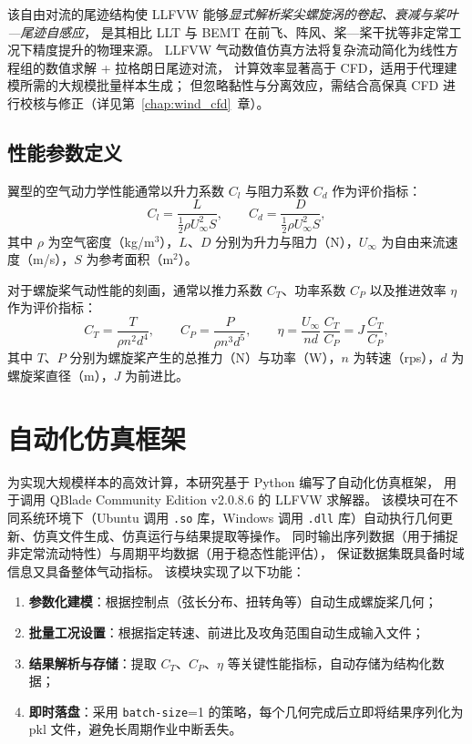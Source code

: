 该自由对流的尾迹结构使 LLFVW 能够\emph{显式解析桨尖螺旋涡的卷起、衰减与桨叶—尾迹自感应}，
是其相比 LLT 与 BEMT 在前飞、阵风、桨—桨干扰等非定常工况下精度提升的物理来源。
LLFVW 气动数值仿真方法将复杂流动简化为线性方程组的数值求解 + 拉格朗日尾迹对流，
计算效率显著高于 CFD，适用于代理建模所需的大规模批量样本生成；
但忽略黏性与分离效应，需结合高保真 CFD 进行校核与修正（详见第~\ref{chap:wind_cfd}~章）。

\subsection{性能参数定义}

翼型的空气动力学性能通常以升力系数 $C_l$ 与阻力系数 $C_d$ 作为评价指标：
\begin{equation}
C_l = \frac{L}{\tfrac{1}{2}\rho U_\infty^2 S}, \qquad C_d = \frac{D}{\tfrac{1}{2}\rho U_\infty^2 S},
\end{equation}
其中 $\rho$ 为空气密度（kg/m$^3$），$L$、$D$ 分别为升力与阻力（N），$U_\infty$ 为自由来流速度（m/s），$S$ 为参考面积（m$^2$）。

对于螺旋桨气动性能的刻画，通常以推力系数 $C_T$、功率系数 $C_P$ 以及推进效率 $\eta$ 作为评价指标：
\begin{equation}
C_T = \frac{T}{\rho n^2 d^4}, \qquad C_P = \frac{P}{\rho n^3 d^5}, \qquad \eta = \frac{U_\infty}{n d}\,\frac{C_T}{C_P} = J\,\frac{C_T}{C_P},
\end{equation}
其中 $T$、$P$ 分别为螺旋桨产生的总推力（N）与功率（W），$n$ 为转速（rps），$d$ 为螺旋桨直径（m），$J$ 为前进比。

\section{自动化仿真框架}

为实现大规模样本的高效计算，本研究基于 Python 编写了自动化仿真框架，
用于调用 QBlade Community Edition v2.0.8.6 的 LLFVW 求解器。
该模块可在不同系统环境下（Ubuntu 调用 \texttt{.so} 库，Windows 调用 \texttt{.dll} 库）自动执行几何更新、仿真文件生成、仿真运行与结果提取等操作。
同时输出序列数据（用于捕捉非定常流动特性）与周期平均数据（用于稳态性能评估），
保证数据集既具备时域信息又具备整体气动指标。
该模块实现了以下功能：
\begin{enumerate}
  \item \textbf{参数化建模}：根据控制点（弦长分布、扭转角等）自动生成螺旋桨几何；
  \item \textbf{批量工况设置}：根据指定转速、前进比及攻角范围自动生成输入文件；
  \item \textbf{结果解析与存储}：提取 $C_T$、$C_P$、$\eta$ 等关键性能指标，自动存储为结构化数据；
  \item \textbf{即时落盘}：采用 \texttt{batch-size}=1 的策略，每个几何完成后立即将结果序列化为 pkl 文件，避免长周期作业中断丢失。
\end{enumerate}

